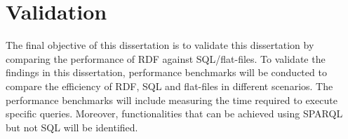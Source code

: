 \section{Validation}

The final objective of this dissertation is to validate this dissertation by comparing the performance of RDF against SQL/flat-files.  To validate the findings in this dissertation, performance benchmarks will be conducted to compare the efficiency of RDF, SQL and flat-files in different scenarios.  The performance benchmarks will include measuring the time required to execute specific queries.  Moreover, functionalities that can be achieved using SPARQL but not SQL will be identified.

